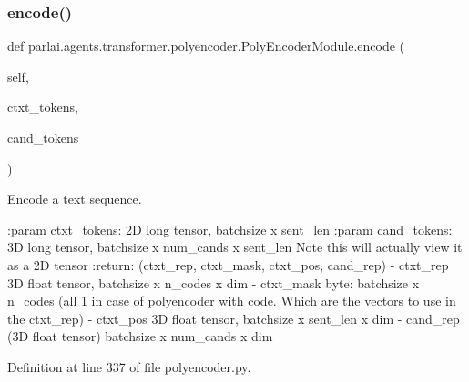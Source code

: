 \subsubsection{\texorpdfstring{encode()}{encode()}}
{\footnotesize\ttfamily def parlai.\+agents.\+transformer.\+polyencoder.\+Poly\+Encoder\+Module.\+encode (\begin{DoxyParamCaption}\item[{}]{self,  }\item[{}]{ctxt\+\_\+tokens,  }\item[{}]{cand\+\_\+tokens }\end{DoxyParamCaption})}

\begin{DoxyVerb}Encode a text sequence.

:param ctxt_tokens:
    2D long tensor, batchsize x sent_len
:param cand_tokens:
    3D long tensor, batchsize x num_cands x sent_len
    Note this will actually view it as a 2D tensor
:return:
    (ctxt_rep, ctxt_mask, ctxt_pos, cand_rep)
    - ctxt_rep 3D float tensor, batchsize x n_codes x dim
    - ctxt_mask byte:  batchsize x n_codes (all 1 in case
    of polyencoder with code. Which are the vectors to use
    in the ctxt_rep)
    - ctxt_pos 3D float tensor, batchsize x sent_len x dim
    - cand_rep (3D float tensor) batchsize x num_cands x dim
\end{DoxyVerb}
 

Definition at line 337 of file polyencoder.\+py.


